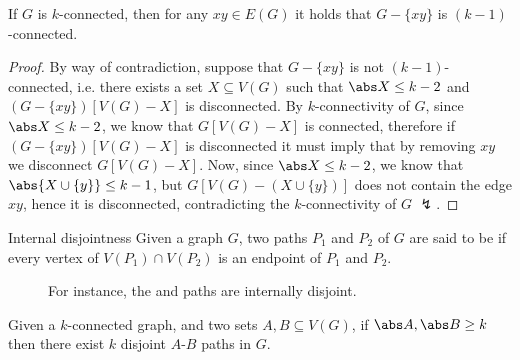 \documentclass[a4paper, 12pt]{report}
\begin{document}
    \begin{framedprop}[label={k-1 conn}]{}
        If $G$ is $k$-connected, then for any $xy \in E(G)$ it holds that $G - \{xy\}$ is $(k - 1)$-connected.
    \end{framedprop}

    \begin{proof}
        By way of contradiction, suppose that $G - \{xy\}$ is not $(k - 1)$-connected, i.e. there exists a set $X \subseteq V(G)$ such that $\abs X \le k - 2$ and $(G - \{xy\})[V(G) - X]$ is disconnected. By $k$-connectivity of $G$, since $\abs X \le k - 2$, we know that $G[V(G) - X]$ is connected, therefore if $(G - \{xy\})[V(G) - X]$ is disconnected it must imply that by removing $xy$ we disconnect $G[V(G) - X]$. Now, since $\abs X \le k - 2$, we know that $\abs{X \cup \{y\}} \le k - 1$, but $G[V(G) - (X \cup \{y\})]$ does not contain the edge $xy$, hence it is disconnected, contradicting the $k$-connectivity of $G$ $\lightning$.
    \end{proof}

    \begin{frameddefn}{Internal disjointness}
        Given a graph $G$, two paths $P_1$ and $P_2$ of $G$ are said to be  if every vertex of $V(P_1) \cap V(P_2)$ is an endpoint of $P_1$ and $P_2$.
    \end{frameddefn}

    \begin{figure}[H]
        \centering
        \caption{For instance, the  and  paths are internally disjoint.}
    \end{figure}

    \begin{framedprop}{}
        Given a $k$-connected graph, and two sets $A, B \subseteq V(G)$, if $\abs A, \abs B \ge k$ then there exist $k$ disjoint $A$-$B$ paths in $G$.
    \end{framedprop}
\end{document}
